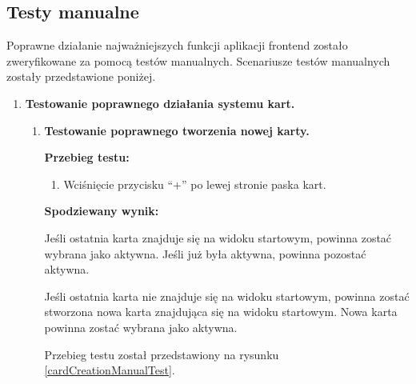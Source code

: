 \subsection{Testy manualne}

Poprawne działanie najważniejszych funkcji aplikacji frontend zostało
zweryfikowane za pomocą testów manualnych. Scenariusze testów manualnych zostały
przedstawione poniżej.

\begin{enumerate}

    \item \textbf{Testowanie poprawnego działania systemu kart.}

        \begin{enumerate}

            \item \textbf{Testowanie poprawnego tworzenia nowej karty.}

                \textbf{Przebieg testu:}

                \begin{enumerate}

                    \item Wciśnięcie przycisku ``+'' po lewej stronie paska
                        kart.

                \end{enumerate}

                \textbf{Spodziewany wynik:}

                Jeśli ostatnia karta znajduje się na widoku startowym, powinna
                zostać wybrana jako aktywna. Jeśli już była aktywna, powinna
                pozostać aktywna.

                Jeśli ostatnia karta nie znajduje się na widoku startowym,
                powinna zostać stworzona nowa karta znajdująca się na widoku
                startowym. Nowa karta powinna zostać wybrana jako aktywna.

                Przebieg testu został przedstawiony na rysunku \ref{cardCreationManualTest}.

                \begin{figure}[h]
                    \centering



\end{figure}
\end{enumerate}
\end{enumerate}

